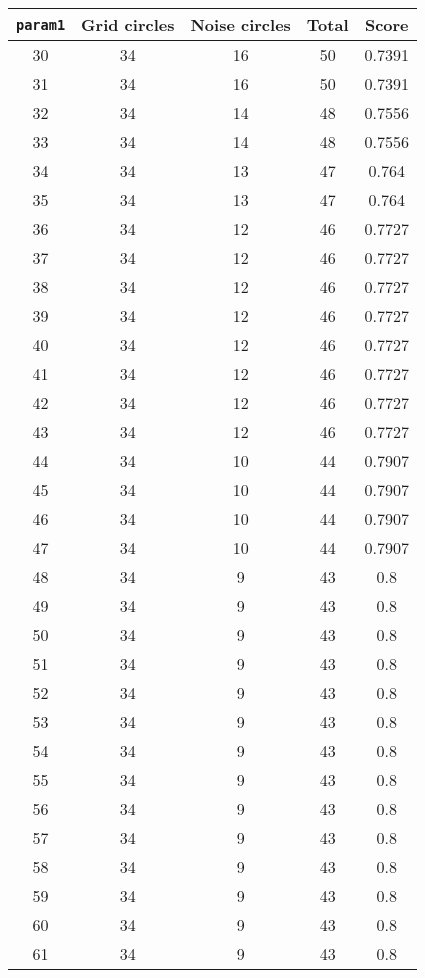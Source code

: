 \documentclass[letterpaper, 12pt]{article}
\begin{document}
\begin{longtable}{|c|c|c|c|c|}
\hline
\textbf{\texttt{param1}} & \textbf{Grid circles} & \textbf{Noise circles} & \textbf{Total} & \textbf{Score} \\
\hline
30 & 34 & 16 & 50 & 0.7391 \\
\hline
31 & 34 & 16 & 50 & 0.7391 \\
\hline
32 & 34 & 14 & 48 & 0.7556 \\
\hline
33 & 34 & 14 & 48 & 0.7556 \\
\hline
34 & 34 & 13 & 47 & 0.764 \\
\hline
35 & 34 & 13 & 47 & 0.764 \\
\hline
36 & 34 & 12 & 46 & 0.7727 \\
\hline
37 & 34 & 12 & 46 & 0.7727 \\
\hline
38 & 34 & 12 & 46 & 0.7727 \\
\hline
39 & 34 & 12 & 46 & 0.7727 \\
\hline
40 & 34 & 12 & 46 & 0.7727 \\
\hline
41 & 34 & 12 & 46 & 0.7727 \\
\hline
42 & 34 & 12 & 46 & 0.7727 \\
\hline
43 & 34 & 12 & 46 & 0.7727 \\
\hline
44 & 34 & 10 & 44 & 0.7907 \\
\hline
45 & 34 & 10 & 44 & 0.7907 \\
\hline
46 & 34 & 10 & 44 & 0.7907 \\
\hline
47 & 34 & 10 & 44 & 0.7907 \\
\hline
48 & 34 & 9 & 43 & 0.8 \\
\hline
49 & 34 & 9 & 43 & 0.8 \\
\hline
50 & 34 & 9 & 43 & 0.8 \\
\hline
51 & 34 & 9 & 43 & 0.8 \\
\hline
52 & 34 & 9 & 43 & 0.8 \\
\hline
53 & 34 & 9 & 43 & 0.8 \\
\hline
54 & 34 & 9 & 43 & 0.8 \\
\hline
55 & 34 & 9 & 43 & 0.8 \\
\hline
56 & 34 & 9 & 43 & 0.8 \\
\hline
57 & 34 & 9 & 43 & 0.8 \\
\hline
58 & 34 & 9 & 43 & 0.8 \\
\hline
59 & 34 & 9 & 43 & 0.8 \\
\hline
60 & 34 & 9 & 43 & 0.8 \\
\hline
61 & 34 & 9 & 43 & 0.8 \\

\end{longtable}
\end{document}
